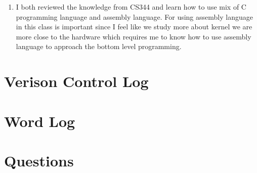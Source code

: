 \documentclass[letterpaper,11pt,titlepage]{article}
\begin{document}
\begin{enumerate}
\item I both reviewed the knowledge from CS344 and learn how to use mix of C programming language and assembly language. For using assembly language in this class is important since I feel like we study more about kernel we are more close to the hardware which requires me 
to know how to use assembly language to approach the bottom level programming.

\end{enumerate} 




\section{Verison Control Log}


\section{Word Log}



\section{Questions}
\end{document}
